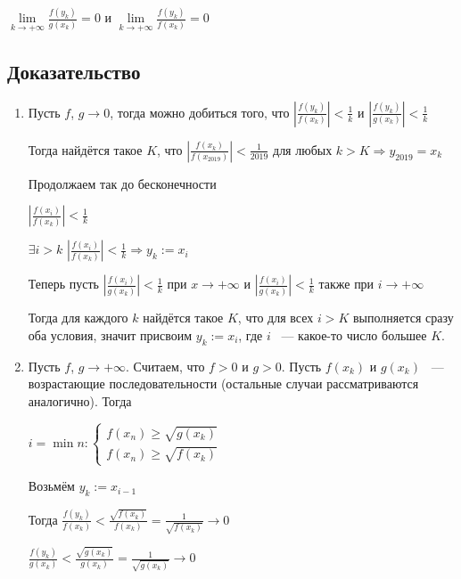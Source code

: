 \documentclass{article}
\begin{document}
			$\lim\limits_{k \rightarrow +\infty} \frac{f(y_k)}{g(x_k)} = 0$ и $\lim\limits_{k \rightarrow +\infty} \frac{f(y_k)}{f(x_k)} = 0$
			
		\subsection{Доказательство}
		
			\begin{enumerate}
			
				\item Пусть $f$, $g \rightarrow 0$, тогда можно добиться того, что $\left| \frac{f(y_k)}{f(x_k)} \right| < \frac{1}{k}$ и $\left| \frac{f(y_k)}{g(x_k)} \right| < \frac{1}{k}$
			
					Тогда найдётся такое $K$, что $\left| \frac{f(x_k)}{f(x_{2019})} \right| < \frac{1}{2019}$ для любых $k > K \Longrightarrow y_{2019} = x_k$
			
					Продолжаем так до бесконечности
			
					$\left| \frac{f(x_i)}{f(x_k)} \right| < \frac{1}{k}$
			
					$\exists i > k$ $\left| \frac{f(x_i)}{f(x_k)} \right| < \frac{1}{k} \Rightarrow y_k := x_i$

					Теперь пусть $\left| \frac{f(x_i)}{g(x_k)} \right| < \frac{1}{k}$ при $x \rightarrow +\infty$ и $\left| \frac{f(x_i)}{g(x_k)} \right| < \frac{1}{k}$ также при $i \rightarrow +\infty$
			
					Тогда для каждого $k$ найдётся такое $K$, что для всех $i > K$ выполняется сразу оба условия, значит присвоим $y_k := x_i$, где $i$ ~--- какое-то число большее $K$.
		
				\item Пусть $f$, $g \rightarrow +\infty$. Считаем, что $f > 0$ и $g > 0$. Пусть $f(x_k)$ и $g(x_k)$ ~--- возрастающие последовательности (остальные случаи рассматриваются аналогично). Тогда
				
					$i = \min n: \begin{cases} f(x_n) \geq \sqrt{g(x_k)} \\ f(x_n) \geq \sqrt{f(x_k)} \end{cases}$
					
					Возьмём $y_k := x_{i - 1}$
					
					Тогда $\frac{f(y_k)}{f(x_k)} < \frac{\sqrt{f(x_k)}}{f(x_k)} = \frac{1}{\sqrt{f(x_k)}} \rightarrow 0$
					
						$\frac{f(y_k)}{g(x_k)} < \frac{\sqrt{g(x_k)}}{g(x_k)}= \frac{1}{\sqrt{g(x_k)}} \rightarrow 0$
					
			\end{enumerate}	
			
\end{document}
